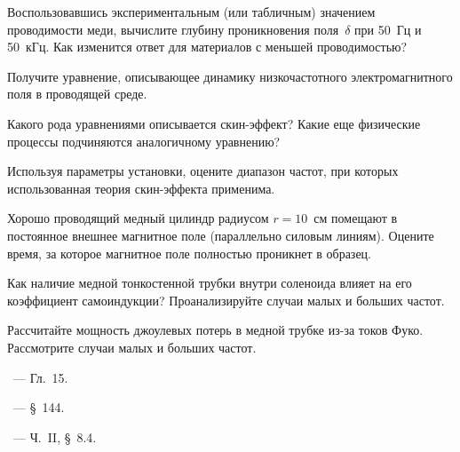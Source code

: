 \begin{lab:questions}
\item Воспользовавшись экспериментальным (или табличным) значением
проводимости меди, вычислите глубину проникновения поля~$\delta$
при 50~Гц и 50~кГц. Как изменится ответ для материалов с меньшей
проводимостью?

\item Получите уравнение, описывающее динамику низкочастотного электромагнитного
поля в проводящей среде.

\item Какого рода уравнениями описывается скин-эффект? Какие еще физические
процессы подчиняются аналогичному уравнению?

\item Используя параметры установки, оцените диапазон частот,
при которых использованная теория скин-эффекта применима.

\item Хорошо проводящий медный цилиндр радиусом $r=10$~см помещают в постоянное внешнее магнитное поле
(параллельно силовым линиям). Оцените время, за которое магнитное поле полностью проникнет в образец.

\item Как наличие медной тонкостенной трубки внутри соленоида влияет
на его коэффициент самоиндукции?
Проанализируйте случаи малых и больших частот.

\item Рассчитайте мощность джоулевых потерь в медной трубке из-за токов Фуко.
Рассмотрите случаи малых и больших частот.
%

%
%

\end{lab:questions}


\begin{lab:literature}
\item \Kirichenko~--- Гл.~15.

\item \SivuhinIII~--- \S~144.

\item \KingLokOlh~--- Ч.~II, \S~8.4.
\end{lab:literature}
